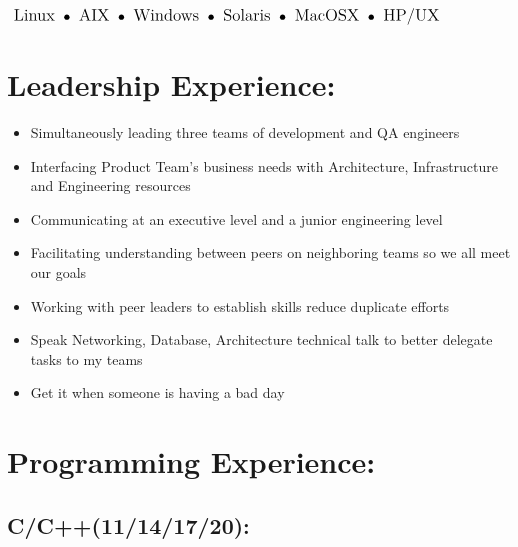 \documentclass[10pt]{report}
\begin{document}
\begin{math}
\large
\textrm{ Linux }
\bullet \space \textrm{ AIX } \space
\bullet \space \textrm{ Windows } \space
\bullet \space \textrm{ Solaris } \space
\bullet \space \textrm{ MacOSX } \space
\bullet \space \textrm{ HP/UX }
\end{math}

\pagebreak

\section*{Leadership Experience:}

\begin{itemize}
	\item Simultaneously leading three teams of development and QA engineers 
	\item Interfacing Product Team's business needs with Architecture, Infrastructure and Engineering resources
	\item Communicating at an executive level and a junior engineering level
	\item Facilitating understanding between peers on neighboring teams so we all meet our goals
	\item Working with peer leaders to establish skills reduce duplicate efforts
	\item Speak Networking, Database, Architecture technical talk to better delegate tasks to my teams
	\item Get it when someone is having a bad day
\end{itemize}


\section*{Programming Experience:}

\subsection*{C/C++(11/14/17/20):}
\end{document}
